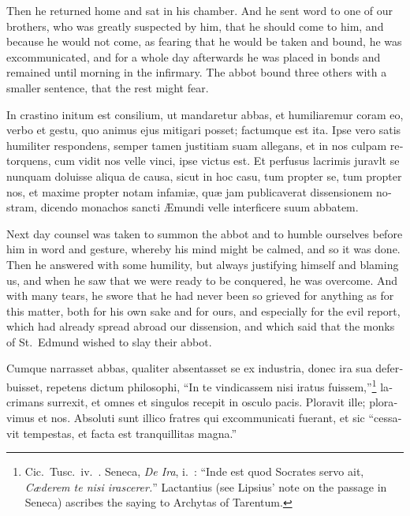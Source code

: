 \documentclass{book}
\newcounter{engnote}
\newcommand{\engnotetext}[1]{\vphantom{\footnotemark{}}\footnotetext{#1}}
\begin{document}
\begin{paracol}{2}
\switchcolumn

Then he returned home and sat in his chamber. And he sent word to one of our brothers, who was greatly suspected by him, that he should come to him, and because he would not come, as fearing that he would be taken and bound, he was excommunicated, and for a whole day afterwards he was placed in bonds and remained until morning in the infirmary. The abbot bound three others with a smaller sentence, that the rest might fear.

\switchcolumn*

\begin{otherlanguage}{latin}
In crastino initum est consilium, ut mandaretur abbas, et humiliaremur coram eo, verbo et gestu, quo animus ejus mitigari posset; factumque est ita. Ipse vero satis humiliter respondens, semper tamen justitiam suam allegans, et in nos culpam retorquens, cum vidit nos velle vinci, ipse victus est. Et perfusus lacrimis juravlt se nunquam doluisse aliqua de causa, sicut in hoc casu, tum propter se, tum propter nos, et maxime propter notam infami\ae{}, qu\ae{} jam publicaverat dissensionem nostram, dicendo monachos sancti \AE{}mundi velle interficere suum abbatem.
\end{otherlanguage}

\switchcolumn

Next day counsel was taken to summon the abbot and to humble ourselves before him in word and gesture, whereby his mind might be calmed, and so it was done. Then he answered with some humility, but always justifying himself and blaming us, and when he saw that we were ready to be conquered, he was overcome. And with many tears, he swore that he had never been so grieved for anything as for this matter, both for his own sake and for ours, and especially for the evil report, which had already spread abroad our dissension, and which said that the monks of St.\ Edmund wished to slay their abbot.

\switchcolumn*

\begin{otherlanguage}{latin}
Cumque narrasset abbas, qualiter absentasset se ex industria, donec ira sua deferbuisset, repetens dictum philosophi, ``In te vindicassem nisi iratus fuissem,''\footnote[\textdagger]{Cic.\ Tusc.\ iv.\ . Seneca, \emph{De Ira}, i.\ : ``Inde est quod Socrates servo ait, \emph{C\ae{}derem te nisi irascerer.}'' Lactantius (see Lipsius' note on the passage in Seneca) ascribes the saying to Archytas of Tarentum.} lacrimans surrexit, et omnes et singulos recepit in osculo pacis. Ploravit ille; ploravimus et nos. Absoluti sunt illico fratres qui excommunicati fuerant, et sic ``cessavit tempestas, et facta est tranquillitas magna.''\engnotetext{Mark iv., \oldstylenums{39}.}
\end{otherlanguage}


\end{paracol}
\end{document}
